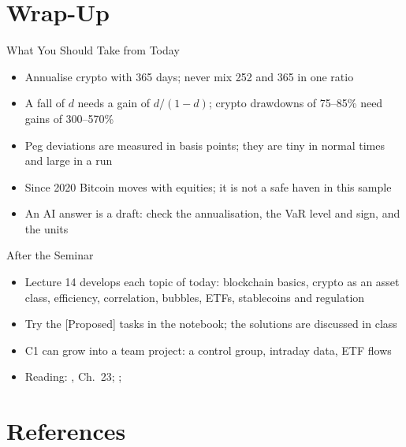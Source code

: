 \section{Wrap-Up}

\begin{frame}{What You Should Take from Today}
\itemsize{\small}
\begin{itemize}
    \item Annualise crypto with 365 days; never mix 252 and 365 in one ratio
    \item A fall of $d$ needs a gain of $d/(1 - d)$; crypto drawdowns of 75--85\% need gains of 300--570\%
    \item Peg deviations are measured in basis points; they are tiny in normal times and large in a run
    \item Since 2020 Bitcoin moves with equities; it is not a safe haven in this sample
    \item An AI answer is a draft: check the annualisation, the VaR level and sign, and the units
\end{itemize}
\end{frame}

\begin{frame}{After the Seminar}
\itemsize{\small}
\begin{itemize}
    \item Lecture 14 develops each topic of today: blockchain basics, crypto as an asset class, efficiency, correlation, bubbles, ETFs, stablecoins and regulation
    \item Try the [Proposed] tasks in the notebook; the solutions are discussed in class
    \item C1 can grow into a team project: a control group, intraday data, ETF flows
    \item Reading: , Ch.~23; ; 
\end{itemize}
\end{frame}


\section{References}

